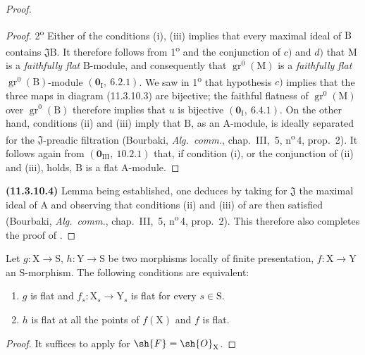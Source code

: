\begin{proof}
\begin{proof}
2\textsuperscript{o} Either of the conditions (i), (iii) implies that every maximal ideal of $\mathrm{B}$ contains $\mathfrak{J}\mathrm{B}$. It therefore follows from 1\textsuperscript{o} and the conjunction of $c)$ and $d)$ that $\mathrm{M}$ is a \emph{faithfully flat} $\mathrm{B}$-module, and consequently that $\operatorname{gr}^0(\mathrm{M})$ is a \emph{faithfully flat} $\operatorname{gr}^0(\mathrm{B})$-module $(\mathbf{0}_{\mathrm{I}},~6.2.1)$. We saw in 1\textsuperscript{o} that hypothesis $c)$ implies that the three maps in diagram \textup{(11.3.10.3)} are bijective; the faithful flatness of $\operatorname{gr}^0(\mathrm{M})$ over $\operatorname{gr}^0(\mathrm{B})$ therefore implies that $u$ is bijective $(\mathbf{0}_{\mathrm{I}},~6.4.1)$. On the other hand, conditions (ii) and (iii) imply that $\mathrm{B}$, as an $\mathrm{A}$-module, is ideally separated for the $\mathfrak{J}$-preadic filtration (Bourbaki, \emph{Alg.\ comm.}, chap.~III, \textsection\,5, n\textsuperscript{o}\,4, prop.~2). It follows again from $(\mathbf{0}_{\mathrm{III}},~10.2.1)$ that, if condition (i), or the conjunction of (ii) and (iii), holds, $\mathrm{B}$ is a flat $\mathrm{A}$-module.
\end{proof}

\label{IV.11.3.10.4}
\textbf{(11.3.10.4)} Lemma  being established, one deduces  by taking for $\mathfrak{J}$ the maximal ideal of $\mathrm{A}$ and observing that conditions (ii) and (iii) of  are then satisfied (Bourbaki, \emph{Alg.\ comm.}, chap.~III, \textsection\,5, n\textsuperscript{o}\,4, prop.~2). This therefore also completes the proof of .
\end{proof}

\begin{corollary}[11.3.11]
\label{IV.11.3.11}
Let $g:\mathrm{X}\to\mathrm{S}$, $h:\mathrm{Y}\to\mathrm{S}$ be two morphisms locally of finite presentation, $f:\mathrm{X}\to\mathrm{Y}$ an $\mathrm{S}$-morphism. The following conditions are equivalent:
\begin{enumerate}[label=\emph{\alph*)}]
  \item $g$ is flat and $f_s:\mathrm{X}_s\to\mathrm{Y}_s$ is flat for every $s\in\mathrm{S}$.
  \item $h$ is flat at all the points of $f(\mathrm{X})$ and $f$ is flat.
\end{enumerate}
\end{corollary}

\begin{proof}
It suffices to apply  for $\sh{F}=\sh{O}_\mathrm{X}$.
\end{proof}

